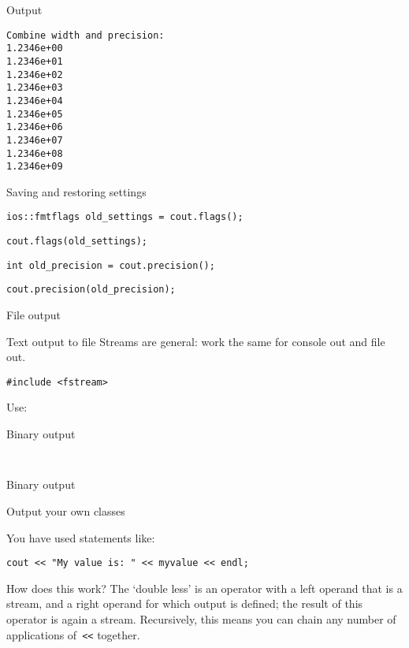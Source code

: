 \begin{block}{Output}
  \label{sl:io-sci-out}
\begin{verbatim}
Combine width and precision:
1.2346e+00
1.2346e+01
1.2346e+02
1.2346e+03
1.2346e+04
1.2346e+05
1.2346e+06
1.2346e+07
1.2346e+08
1.2346e+09
\end{verbatim}
\end{block}

 {Saving and restoring settings}

\begin{verbatim}
ios::fmtflags old_settings = cout.flags();
\end{verbatim}

\begin{verbatim}
cout.flags(old_settings);
\end{verbatim}

\begin{verbatim}
int old_precision = cout.precision();
\end{verbatim}

\begin{verbatim}
cout.precision(old_precision);
\end{verbatim}

 {File output}

\begin{block}{Text output to file}
  \label{sl:io-file}
Streams are general: work the same for console out and file out.
\begin{verbatim}
#include <fstream>
\end{verbatim}
Use:
\end{block}

\begin{block}{Binary output}
  \label{sl:io-bin}
\begin{verbatim}
  
\end{verbatim}
\end{block}

 {Binary output}



 {Output your own classes}
\label{sec:lessless}

You have used statements like:
\begin{verbatim}
cout << "My value is: " << myvalue << endl;
\end{verbatim}
How does this work? The `double less' is an operator with a left
operand that is a stream, and a right operand for which output is
defined; the result of this operator is again a stream. Recursively,
this means you can chain any number of applications of~\verb+<<+
together.


